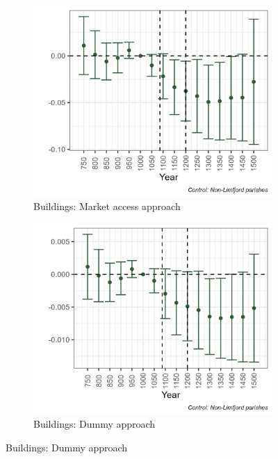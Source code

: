 \begin{figure}
\begin{subfigure}[b]{0.45\textwidth}
    \end{subfigure}
    \vspace{0.45cm}
    \begin{subfigure}[b]{0.45\textwidth}
        \centering
        \caption{Buildings: Market access approach} \label{fig:arch1c_match_norm}
        \includegraphics[width=\textwidth]{Plots/Regression_plots/arch_MA_buildings_matched_norm.png}
    \end{subfigure}
    \hfill
    \begin{subfigure}[b]{0.45\textwidth}
        \centering
        \caption{Buildings: Dummy approach} \label{fig:arch1d_match_norm}
        \includegraphics[width=\textwidth]{Plots/Regression_plots/arch_dummy_buildings_matched_norm.png}
    \end{subfigure}
    \label{fig:arch_reg2}
\end{figure}


